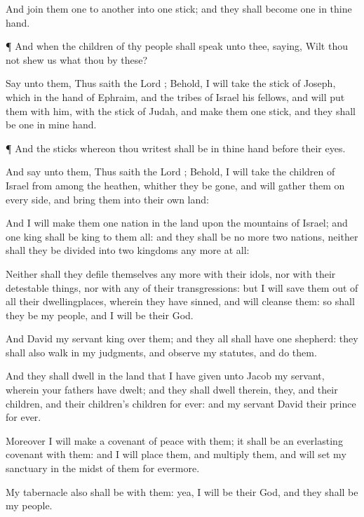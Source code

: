 {And
join them
one to
another into
one
stick; and they shall become
one in thine
hand.


\par }{\PP {}¶ And when the
children of thy
people shall
speak unto thee,
saying, Wilt thou not
shew us what thou
{} by these?

Say unto them, Thus
saith the
Lord
{}; Behold, I will
take the
stick of
Joseph, which
{} in the
hand of
Ephraim, and the
tribes of
Israel his
fellows, and will
put them with him,
{} with the
stick of
Judah, and
make them
one
stick, and they shall be
one in mine
hand.


\par }{\PP {}¶ And the
sticks whereon thou
writest shall be in thine
hand before their
eyes.

And
say unto them, Thus
saith the
Lord
{}; Behold, I will
take the
children of
Israel from
among the
heathen, whither they be
gone, and will
gather them on every
side, and
bring them into their own
land:

And I will
make them
one
nation in the
land upon the
mountains of
Israel; and
one
king shall be
king to them all: and they shall
be no more
two
nations, neither shall they be
divided into
two
kingdoms any more at all:

Neither shall they
defile themselves any more with their
idols, nor with their detestable
things, nor with any of their
transgressions: but I will
save them out of all their
dwellingplaces, wherein they have
sinned, and will
cleanse them: so shall they be my
people, and I will be their
God.

And
David my
servant
{}
king over them; and they all shall have
one
shepherd: they shall also
walk in my
judgments, and
observe my
statutes, and
do them.

And they shall
dwell in the
land that I have
given unto
Jacob my
servant, wherein your
fathers have
dwelt; and they shall
dwell therein,
{} they, and their
children, and their
children’s
children for
ever: and my
servant
David
{} their
prince
for
ever.

Moreover I will
make a
covenant of
peace with them; it shall be an
everlasting
covenant with them: and I will
place them, and
multiply them, and will
set my
sanctuary in the
midst of them for
evermore.

My
tabernacle also shall be with them: yea, I will be their
God, and they shall be my
people.

}
